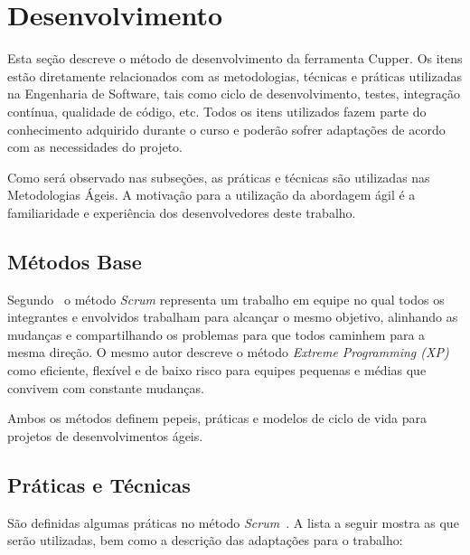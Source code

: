 \section{Desenvolvimento}

Esta seção descreve o método de desenvolvimento da ferramenta Cupper.
Os itens estão diretamente relacionados com as metodologias, técnicas e
práticas utilizadas na Engenharia de Software, tais como ciclo de
desenvolvimento, testes, integração contínua, qualidade de código, etc.
Todos os itens utilizados fazem parte do conhecimento adquirido durante
o curso e poderão sofrer adaptações de acordo com as necessidades do projeto.

Como será observado nas subseções, as práticas e técnicas são utilizadas
nas Metodologias Ágeis. A motivação para a utilização da abordagem
ágil é a familiaridade e experiência dos desenvolvedores deste trabalho.

\subsection{Métodos Base}

Segundo~ o método \textit{Scrum} representa um trabalho
em equipe no qual todos os integrantes e envolvidos trabalham para alcançar
o mesmo objetivo, alinhando as mudanças e compartilhando os problemas para que
todos caminhem para a mesma direção. O mesmo autor descreve o método
\textit{Extreme Programming (XP)} como eficiente, flexível e de baixo risco para equipes
pequenas e médias que convivem com constante mudanças.

Ambos os métodos definem pepeis, práticas e modelos de ciclo de vida para
projetos de desenvolvimentos ágeis.

\subsection{Práticas e Técnicas}

São definidas algumas práticas no método \textit{Scrum}~\cite{gutierrez:2009}. A lista a seguir
mostra as que serão utilizadas, bem como a descrição das adaptações para o trabalho:

